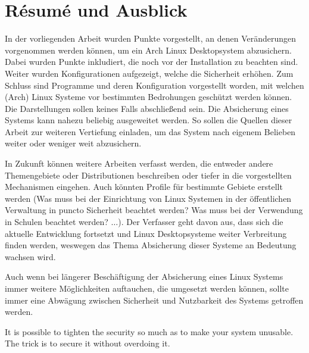\section{Résumé und Ausblick}
In der vorliegenden Arbeit wurden Punkte vorgestellt, an denen Veränderungen vorgenommen werden können, um ein Arch Linux Desktopsystem abzusichern. Dabei wurden Punkte inkludiert, die noch vor der Installation zu beachten sind. Weiter wurden Konfigurationen aufgezeigt, welche die Sicherheit erhöhen. Zum Schluss sind Programme und deren Konfiguration vorgestellt worden, mit welchen (Arch) Linux Systeme vor bestimmten Bedrohungen geschützt werden können. Die Darstellungen sollen keines Falls abschließend sein. Die Absicherung eines Systems kann nahezu beliebig ausgeweitet werden. So sollen die Quellen dieser Arbeit zur weiteren Vertiefung einladen, um das System nach eigenem Belieben weiter oder weniger weit abzusichern.

In Zukunft können weitere Arbeiten verfasst werden, die entweder andere Themengebiete oder Distributionen beschreiben oder tiefer in die vorgestellten Mechanismen eingehen. Auch könnten Profile für bestimmte Gebiete erstellt werden {\small(Was muss bei der Einrichtung von Linux Systemen in der öffentlichen Verwaltung in puncto Sicherheit beachtet werden? Was muss bei der Verwendung in Schulen beachtet werden? $\dots$)}. Der Verfasser geht davon aus, dass sich die aktuelle Entwicklung fortsetzt und Linux Desktopsysteme weiter Verbreitung finden werden, weswegen das Thema Absicherung dieser Systeme an Bedeutung wachsen wird.

Auch wenn bei längerer Beschäftigung der Absicherung eines Linux Systems immer weitere Möglichkeiten auftauchen, die umgesetzt werden können, sollte immer eine Abwägung zwischen Sicherheit und Nutzbarkeit des Systems getroffen werden.\cite{EssaysPsychologySecurity2008}

\begin{quoting}
	\centering
	It is possible to tighten the security so much as to make your system unusable. The trick is to secure it without overdoing it.\cite{SecurityArchWiki}
\end{quoting}